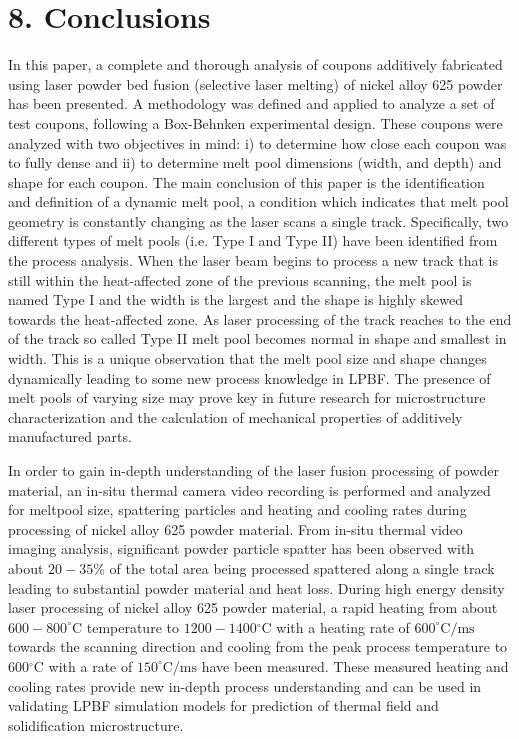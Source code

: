 \documentclass[10pt]{article}
\begin{document}
\section*{8. Conclusions}
In this paper, a complete and thorough analysis of coupons additively fabricated using laser powder bed fusion (selective laser melting) of nickel alloy 625 powder has been presented. A methodology was defined and applied to analyze a set of test coupons, following a Box-Behnken experimental design. These coupons were analyzed with two objectives in mind: i) to determine how close each coupon was to fully dense and ii) to determine melt pool dimensions (width, and depth) and shape for each coupon. The main conclusion of this paper is the identification and definition of a dynamic melt pool, a condition which indicates that melt pool geometry is constantly changing as the laser scans a single track. Specifically, two different types of melt pools (i.e. Type I and Type II) have been identified from the process analysis. When the laser beam begins to process a new track that is still within the heat-affected zone of the previous scanning, the melt pool is named Type I and the width is the largest and the shape is highly skewed towards the heat-affected zone. As laser processing of the track reaches to the end of the track so called Type II melt pool becomes normal in shape and smallest in width. This is a unique observation that the melt pool size and shape changes dynamically leading to some new process knowledge in LPBF. The presence of melt pools of varying size may prove key in future research for microstructure characterization and the calculation of mechanical properties of additively manufactured parts.

In order to gain in-depth understanding of the laser fusion processing of powder material, an in-situ thermal camera video recording is performed and analyzed for meltpool size, spattering particles and heating and cooling rates during processing of nickel alloy 625 powder material. From in-situ thermal video imaging analysis, significant powder particle spatter has been observed with about $20-35 \%$ of the total area being processed spattered along a single track leading to substantial powder material and heat loss. During high energy density laser processing of nickel alloy 625 powder material, a rapid heating from about $600-800^{\circ} \mathrm{C}$ temperature to $1200-1400{ }^{\circ} \mathrm{C}$ with a heating rate of $600^{\circ} \mathrm{C} / \mathrm{ms}$ towards the scanning direction and cooling from the peak process temperature to $600{ }^{\circ} \mathrm{C}$ with a rate of $150^{\circ} \mathrm{C} / \mathrm{ms}$ have been measured. These measured heating and cooling rates provide new in-depth process understanding and can be used in validating LPBF simulation models for prediction of thermal field and solidification microstructure.
\end{document}
